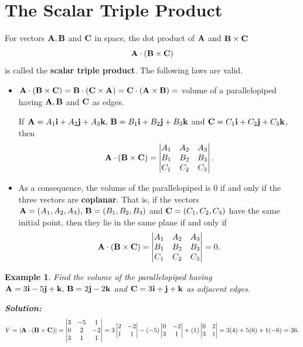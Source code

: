\documentclass[titlepage,a4paper,12pt]{report}
\newtheorem{example}{Example}[section]
\begin{document}
\section{The Scalar Triple Product}
For vectors ${\bf{A}}, {\bf{B}}$ and ${\bf{C}}$ in space, the dot product of ${\bf{A}}$ and ${\bf{B}\times \bf{C}}$ \[{\bf{A}\cdot ( {\bf{B}\times \bf{C}}})\] is called the \textbf{scalar triple product}. The following laws are valid.
\begin{itemize}
\item[(i)] ${\bf{A}\cdot ( {\bf{B}\times \bf{C}}})={\bf{B}\cdot ( {\bf{C}\times \bf{A}}})={\bf{C}\cdot ( {\bf{A}\times \bf{B}}})=$ volume of a parallelopiped having ${\bf{A}}, {\bf{B}}$ and ${\bf{C}}$ as edges.


\noindent  If ${\bf{A}}=A_1{\bf{i}}+A_2{\bf{j}}+A_3{\bf{k}},\, {\bf{B}}=B_1{\bf{i}}+B_2{\bf{j}}+B_3{\bf{k}}$ and ${\bf{C}}=C_1{\bf{i}}+C_2{\bf{j}}+C_3{\bf{k}}$, then 
\[{\bf{A}\cdot ( {\bf{B}\times \bf{C}}}) =\begin{vmatrix}
A_1 & A_2 & A_3\\
B_1 & B_2 & B_3 \\
C_1 & C_2 & C_3
\end{vmatrix}.\]
\item[(ii)] As a consequence, the volume of the parallelopiped is $0$ if and only if the three vectors are \textbf{coplanar}. That is, if the vectors ${\bf{A}}=(A_1, A_2, A_3), \, {\bf{B}}=(B_1, B_2, B_3)$ and ${\bf{C}}=(C_1, C_2, C_3)$ have the same initial point, then they lie in the same plane if and only if 
\[{\bf{A}\cdot ( {\bf{B}\times \bf{C}}}) =\begin{vmatrix}
A_1 & A_2 & A_3\\
B_1 & B_2 & B_3 \\
C_1 & C_2 & C_3
\end{vmatrix} =0.\]
\end{itemize}
\begin{example}
Find the volume of the parallelopiped having ${\bf{A}}=3{\bf{i}}-5{\bf{j}}+{\bf{k}}, \, {\bf{B}}=2{\bf{j}}-2{\bf{k}}$ and ${\bf{C}}=3{\bf{i}}+{\bf{j}}+{\bf{k}}$ as adjacent edges.

\noindent \textbf{Solution:} \[V=|{\bf{A}\cdot ( {\bf{B}\times \bf{C}}})|=\begin{vmatrix}
3 & -5 & 1 \\
0 & 2 & -2 \\
3 & 1 & 1 
\end{vmatrix}=3 \begin{vmatrix}
2 & -2 \\
1 & 1 
\end{vmatrix} -(-5)\begin{vmatrix}
0 & -2 \\
3 & 1 
\end{vmatrix} + (1) \begin{vmatrix}
0 & 2 \\
3 & 1 
\end{vmatrix} =3(4)+5(6)+1(-6)=36.\]
\end{example}
\end{document}
